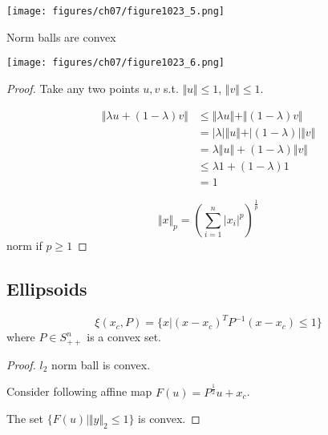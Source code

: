 \begin{marginfigure}
	\centering
	\texttt{[image: figures/ch07/figure1023\_5.png]}
\end{marginfigure}


Norm balls are convex

\begin{marginfigure}
	\centering
	\texttt{[image: figures/ch07/figure1023\_6.png]}
\end{marginfigure}

\begin{proof}
	Take any two points $u,v$ s.t. $\Vert u\Vert \leq 1$, $\Vert v\Vert \leq 1$. 
	
	\begin{align*}
	\Vert \lambda u+(1-\lambda)v\Vert &\leq \Vert \lambda u\Vert + \Vert (1-\lambda)v\Vert\\
	&= \vert \lambda \vert \Vert  u\Vert + \vert (1-\lambda) \vert \Vert  v\Vert\\
	&= \lambda\Vert  u\Vert + (1-\lambda)\Vert  v\Vert\\
	&\leq \lambda 1 + (1-\lambda)1\\
	&= 1
	\end{align*}
	
	\begin{equation*}
	\Vert  x\Vert_p = (\sum^n_{i=1}\vert  x_i\vert^p)^{\frac{1}{p}}
	\end{equation*}
	norm if $p\geq 1$
\end{proof}

\subsection{Ellipsoids}

\begin{equation*}
\xi(x_c, P) =\{x|(x - x_c)^TP^{-1}(x - x_c) \leq 1 \}
\end{equation*}
where $P\in S^n_{++}$   is a convex set.

\begin{proof}
	
	$l_2$ norm ball is convex. 
	
	Consider following affine map $F(u) = P^{\frac{1}{2}}u + x_c$.
	
	The set $\{F(u) | \Vert y\Vert_2 \leq 1 \}$ is convex. 
\end{proof}

